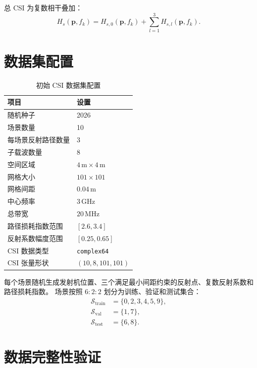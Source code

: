 \documentclass[UTF8,a4paper,11pt]{ctexart}
\begin{document}
总 CSI 为复数相干叠加：
\begin{equation}
    H_s(\mathbf p,f_k)=
    H_{s,0}(\mathbf p,f_k)
    +\sum_{l=1}^{3}H_{s,l}(\mathbf p,f_k).
\end{equation}

\section{数据集配置}

\begin{table}[H]
    \centering
    \caption{初始 CSI 数据集配置}
    \label{tab:dataset-config}
    \begin{tabular}{ll}
        \toprule
        项目 & 设置 \\
        \midrule
        随机种子 & 2026 \\
        场景数量 & 10 \\
        每场景反射路径数量 & 3 \\
        子载波数量 & 8 \\
        空间区域 & $4\,\mathrm m\times4\,\mathrm m$ \\
        网格大小 & $101\times101$ \\
        网格间距 & $0.04\,\mathrm m$ \\
        中心频率 & $3\,\mathrm{GHz}$ \\
        总带宽 & $20\,\mathrm{MHz}$ \\
        路径损耗指数范围 & $[2.6,3.4]$ \\
        反射系数幅度范围 & $[0.25,0.65]$ \\
        CSI 数据类型 & \texttt{complex64} \\
        CSI 张量形状 & $(10,8,101,101)$ \\
        \bottomrule
    \end{tabular}
\end{table}

每个场景随机生成发射机位置、三个满足最小间距约束的反射点、复数反射系数和路径损耗指数。
场景按照 $6:2:2$ 划分为训练、验证和测试集合：
\begin{align}
    \mathcal S_{\mathrm{train}} &= \{0,2,3,4,5,9\},\\
    \mathcal S_{\mathrm{val}} &= \{1,7\},\\
    \mathcal S_{\mathrm{test}} &= \{6,8\}.
\end{align}

\section{数据完整性验证}
\end{document}
